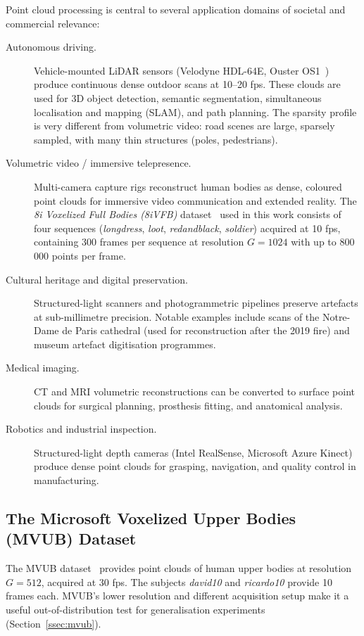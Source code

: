 Point cloud processing is central to several application domains of societal
and commercial relevance:

\begin{description}
  \item[Autonomous driving.]
    Vehicle-mounted LiDAR sensors (Velodyne HDL-64E, Ouster OS1~\cite{roriz2022lidar}) produce
    continuous dense outdoor scans at 10--20 fps.
    These clouds are used for 3D object detection, semantic segmentation,
    simultaneous localisation and mapping (SLAM), and path planning.
    The sparsity profile is very different from volumetric video:
    road scenes are large, sparsely sampled, with many thin structures
    (poles, pedestrians).

  \item[Volumetric video / immersive telepresence.]
    Multi-camera capture rigs reconstruct human bodies as dense, coloured
    point clouds for immersive video communication and extended reality.
    The \textit{8i Voxelized Full Bodies (8iVFB)} dataset~\cite{8ivfb} used in
    this work consists of four sequences (\textit{longdress}, \textit{loot},
    \textit{redandblack}, \textit{soldier}) acquired at 10 fps, containing
    300 frames per sequence at resolution $G = 1024$ with up to 800\,000
    points per frame.

  \item[Cultural heritage and digital preservation.]
    Structured-light scanners and photogrammetric pipelines preserve artefacts
    at sub-millimetre precision.
    Notable examples include scans of the Notre-Dame de Paris cathedral
    (used for reconstruction after the 2019 fire) and museum artefact
    digitisation programmes.

  \item[Medical imaging.]
    CT and MRI volumetric reconstructions can be converted to surface point
    clouds for surgical planning, prosthesis fitting, and anatomical
    analysis.

  \item[Robotics and industrial inspection.]
    Structured-light depth cameras (Intel RealSense, Microsoft Azure Kinect)
    produce dense point clouds for grasping, navigation, and quality control
    in manufacturing.
\end{description}

\subsection{The Microsoft Voxelized Upper Bodies (MVUB) Dataset}

The MVUB dataset~\cite{loop2016mvub} provides point clouds of human
upper bodies at resolution $G = 512$, acquired at 30 fps.
The subjects \textit{david10} and \textit{ricardo10} provide 10 frames each.
MVUB's lower resolution and different acquisition setup make it a useful
out-of-distribution test for generalisation experiments
(Section~\ref{ssec:mvub}).


